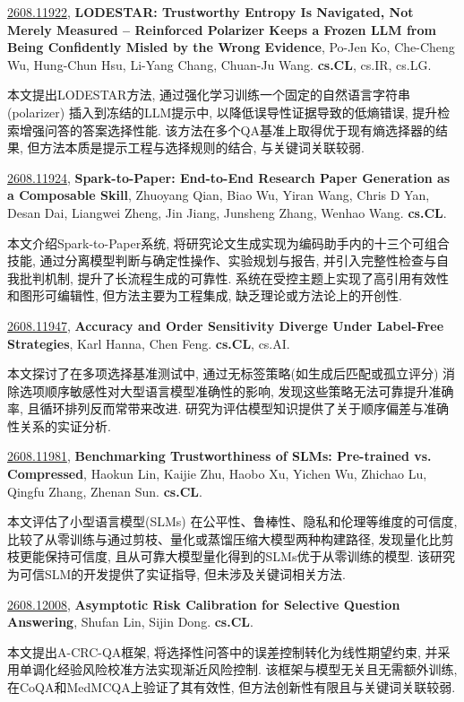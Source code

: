 \documentclass[9pt, a4paper]{article}
\theoremstyle{plain}
\theoremstyle{definition}
\theoremstyle{remark}
\newcommand{\arxivwithtarget}[3]{\hypertarget{#1}{}\href{https://arxiv.org/abs/#1}{#1}, \textbf{\textcolor{arxivblue}{#2}}, #3. }
\begin{document}
\arxivwithtarget{2608.11922}{LODESTAR: Trustworthy Entropy Is Navigated, Not Merely Measured -- Reinforced Polarizer Keeps a Frozen LLM from Being Confidently Misled by the Wrong Evidence}{Po-Jen Ko, Che-Cheng Wu, Hung-Chun Hsu, Li-Yang Chang, Chuan-Ju Wang}\textbf{cs.CL}, cs.IR, cs.LG.

本文提出LODESTAR方法, 通过强化学习训练一个固定的自然语言字符串(polarizer) 插入到冻结的LLM提示中, 以降低误导性证据导致的低熵错误, 提升检索增强问答的答案选择性能. 该方法在多个QA基准上取得优于现有熵选择器的结果, 但方法本质是提示工程与选择规则的结合, 与关键词关联较弱.


\arxivwithtarget{2608.11924}{Spark-to-Paper: End-to-End Research Paper Generation as a Composable Skill}{Zhuoyang Qian, Biao Wu, Yiran Wang, Chris D Yan, Desan Dai, Liangwei Zheng, Jin Jiang, Junsheng Zhang, Wenhao Wang}\textbf{cs.CL}.

本文介绍Spark-to-Paper系统, 将研究论文生成实现为编码助手内的十三个可组合技能, 通过分离模型判断与确定性操作、实验规划与报告, 并引入完整性检查与自我批判机制, 提升了长流程生成的可靠性. 系统在受控主题上实现了高引用有效性和图形可编辑性, 但方法主要为工程集成, 缺乏理论或方法论上的开创性.


\arxivwithtarget{2608.11947}{Accuracy and Order Sensitivity Diverge Under Label-Free Strategies}{Karl Hanna, Chen Feng}\textbf{cs.CL}, cs.AI.

本文探讨了在多项选择基准测试中, 通过无标签策略(如生成后匹配或孤立评分) 消除选项顺序敏感性对大型语言模型准确性的影响, 发现这些策略无法可靠提升准确率, 且循环排列反而常带来改进. 研究为评估模型知识提供了关于顺序偏差与准确性关系的实证分析.


\arxivwithtarget{2608.11981}{Benchmarking Trustworthiness of SLMs: Pre-trained vs. Compressed}{Haokun Lin, Kaijie Zhu, Haobo Xu, Yichen Wu, Zhichao Lu, Qingfu Zhang, Zhenan Sun}\textbf{cs.CL}.

本文评估了小型语言模型(SLMs) 在公平性、鲁棒性、隐私和伦理等维度的可信度, 比较了从零训练与通过剪枝、量化或蒸馏压缩大模型两种构建路径, 发现量化比剪枝更能保持可信度, 且从可靠大模型量化得到的SLMs优于从零训练的模型. 该研究为可信SLM的开发提供了实证指导, 但未涉及关键词相关方法.


\arxivwithtarget{2608.12008}{Asymptotic Risk Calibration for Selective Question Answering}{Shufan Lin, Sijin Dong}\textbf{cs.CL}.

本文提出A-CRC-QA框架, 将选择性问答中的误差控制转化为线性期望约束, 并采用单调化经验风险校准方法实现渐近风险控制. 该框架与模型无关且无需额外训练, 在CoQA和MedMCQA上验证了其有效性, 但方法创新性有限且与关键词关联较弱.
\end{document}
